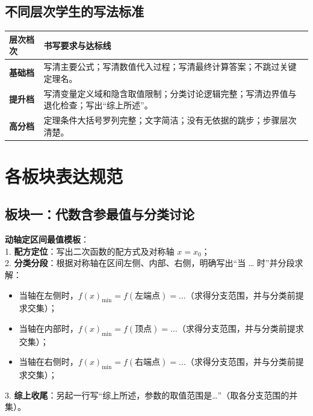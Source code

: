 \documentclass[11pt,a4paper]{ctexart}
\begin{document}
\subsection{不同层次学生的写法标准}
\begingroup
\renewcommand{\arraystretch}{1.3}
\begin{tabularx}{\textwidth}{>{\bfseries}p{2.0cm}X}
\toprule
层次档次 & 书写要求与达标线 \\
\midrule
基础档 & 写清主要公式；写清数值代入过程；写清最终计算答案；不跳过关键定理名。 \\ \hline
提升档 & 写清变量定义域和隐含取值限制；分类讨论逻辑完整；写清边界值与退化检查；写出“综上所述”。 \\ \hline
高分档 & 定理条件大括号罗列完整；文字简洁；没有无依据的跳步；步骤层次清楚。 \\
\bottomrule
\end{tabularx}
\endgroup

\newpage

\section{各板块表达规范}

\subsection{板块一：代数含参最值与分类讨论}
\begin{decisionscan}
  \textbf{动轴定区间最值模板}：\\
  1. \textbf{配方定位}：写出二次函数的配方式及对称轴 \(x = x_0\)；\\
  2. \textbf{分类分段}：根据对称轴在区间左侧、内部、右侧，明确写出“当 \dots{} 时”并分段求解：
  \begin{itemize}[leftmargin=1.5em, itemsep=0em, topsep=0.1em]
    \item 当轴在左侧时，\(f(x)_{\min} = f(\text{左端点}) = \dots\)（求得分支范围，并与分类前提求交集）；
    \item 当轴在内部时，\(f(x)_{\min} = f(\text{顶点}) = \dots\)（求得分支范围，并与分类前提求交集）；
    \item 当轴在右侧时，\(f(x)_{\min} = f(\text{右端点}) = \dots\)（求得分支范围，并与分类前提求交集）；
  \end{itemize}
  3. \textbf{综上收尾}：另起一行写“综上所述，参数的取值范围是\dots”（取各分支范围的并集）。
\end{decisionscan}
\end{document}
